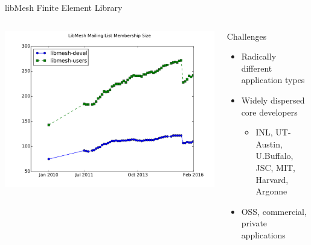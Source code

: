 \documentclass[mathserif]{beamer}
\begin{document}
\begin{frame}{libMesh Finite Element Library}
\begin{columns}
\includegraphics[width=\textwidth]{libmesh_mailinglists_membership}

\begin{block}{Challenges}
\begin{itemize}
\item Radically different application types
\item Widely dispersed core developers
\begin{itemize}
\item INL, UT-Austin, U.Buffalo, JSC, MIT, Harvard, Argonne
\end{itemize}
\item OSS, commercial, private applications
\end{itemize}
\end{block}
\end{columns}

\end{frame}
\end{document}
